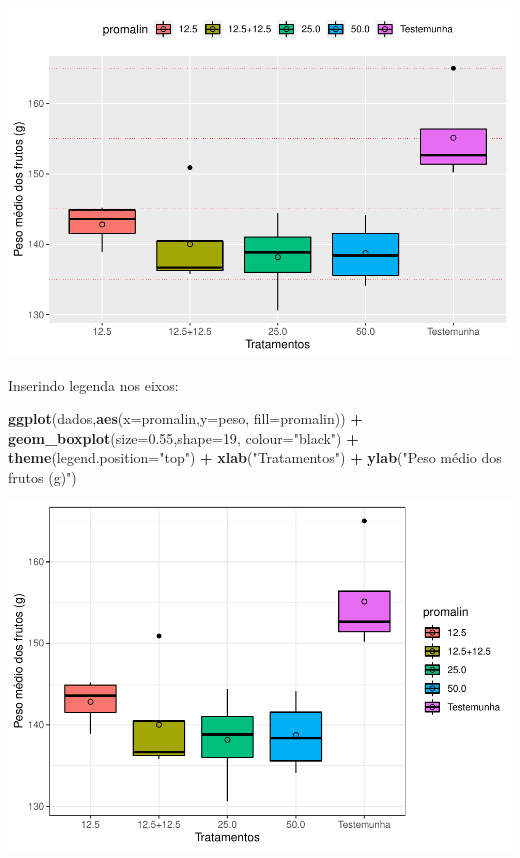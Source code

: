 \documentclass[
]{book}
\newenvironment{Shaded}{\begin{snugshade}}{\end{snugshade}}
\newcommand{\DataTypeTok}[1]{\textcolor[rgb]{0.13,0.29,0.53}{#1}}
\newcommand{\DecValTok}[1]{\textcolor[rgb]{0.00,0.00,0.81}{#1}}
\newcommand{\FloatTok}[1]{\textcolor[rgb]{0.00,0.00,0.81}{#1}}
\newcommand{\KeywordTok}[1]{\textcolor[rgb]{0.13,0.29,0.53}{\textbf{#1}}}
\newcommand{\NormalTok}[1]{#1}
\newcommand{\OperatorTok}[1]{\textcolor[rgb]{0.81,0.36,0.00}{\textbf{#1}}}
\newcommand{\StringTok}[1]{\textcolor[rgb]{0.31,0.60,0.02}{#1}}
\begin{document}
\includegraphics{TudodoR_files/figure-latex/unnamed-chunk-236-1.pdf}

Inserindo legenda nos eixos:

\begin{Shaded}
\begin{Highlighting}[]
\KeywordTok{ggplot}\NormalTok{(dados,}\KeywordTok{aes}\NormalTok{(}\DataTypeTok{x=}\NormalTok{promalin,}\DataTypeTok{y=}\NormalTok{peso, }\DataTypeTok{fill=}\NormalTok{promalin)) }\OperatorTok{+}\StringTok{ }
\StringTok{       }\KeywordTok{geom_boxplot}\NormalTok{(}\DataTypeTok{size=}\FloatTok{0.55}\NormalTok{,}\DataTypeTok{shape=}\DecValTok{19}\NormalTok{, }\DataTypeTok{colour=}\StringTok{"black"}\NormalTok{) }\OperatorTok{+}\StringTok{ }
\StringTok{       }\KeywordTok{theme}\NormalTok{(}\DataTypeTok{legend.position=}\StringTok{"top"}\NormalTok{) }\OperatorTok{+}\StringTok{ }
\StringTok{       }\KeywordTok{xlab}\NormalTok{(}\StringTok{"Tratamentos"}\NormalTok{) }\OperatorTok{+}\StringTok{  }
\StringTok{       }\KeywordTok{ylab}\NormalTok{(}\StringTok{"Peso médio dos frutos (g)"}\NormalTok{) }
\end{Highlighting}
\end{Shaded}

\includegraphics{TudodoR_files/figure-latex/unnamed-chunk-237-1.pdf}
\end{document}
